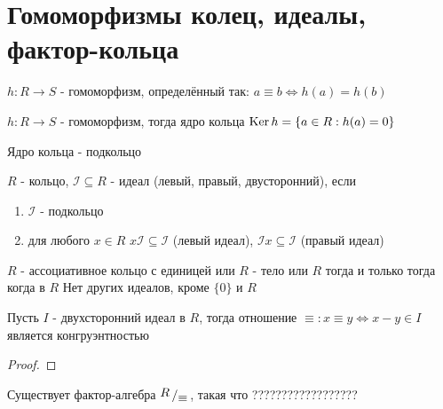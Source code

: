 \documentclass[../main/document.tex]{subfiles}
\begin{document}
\section{Гомоморфизмы колец, идеалы, фактор-кольца}
\begin{dfn}
$h:R\to S$ - гомоморфизм, определённый так: $a\equiv b\Leftrightarrow h(a)=h(b)$
\end{dfn}
\begin{dfn}
$h:R\to S$ - гомоморфизм, тогда ядро кольца $\operatorname{Ker} h=\{a\in R:h(a)=0\}$ 
\end{dfn}
\begin{thm}
Ядро кольца - подкольцо
\end{thm}
\begin{dfn}[Идеал]
$R$ - кольцо, $\mathcal{I}\subseteq R$ - идеал (левый, правый, двусторонний), если
\begin{enumerate}
\item $\mathcal{I}$ - подкольцо
\item для любого $x\in R$ $x\mathcal{I}\subseteq\mathcal{I}$ (левый идеал), $\mathcal{I} x\subseteq\mathcal{I}$ (правый идеал)
\end{enumerate}
\end{dfn}
\begin{exm}

\end{exm}
\begin{thm}
$R$ - ассоциативное кольцо с единицей или $R$ - тело или $R$ тогда и только тогда когда в $R$ Нет других идеалов, кроме $\{0\}$ и $R$
\end{thm}
\begin{dfn}

\end{dfn}
\begin{thm}
Пусть $I$ - двухсторонний идеал в $R$, тогда отношение $\equiv: x\equiv y \Leftrightarrow x-y\in I$ является конгруэнтностью
\begin{proof}

\end{proof}
\end{thm}
\begin{cnsq}
Существует фактор-алгебра $\bigslant{R}{\equiv}$, такая что ??????????????????
\end{cnsq}
\end{document}
